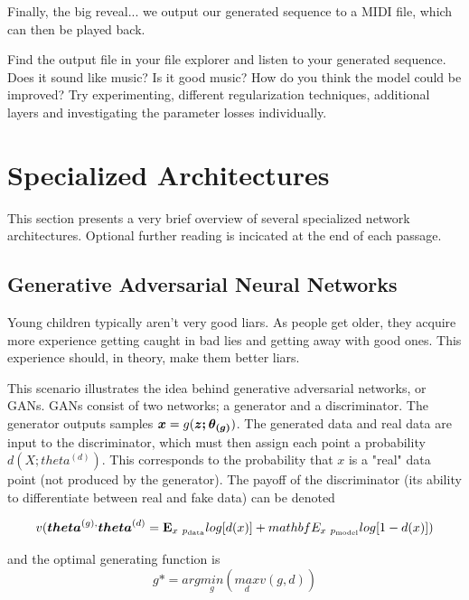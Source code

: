 \documentclass{article}
\begin{document}


Finally, the big reveal... we output our generated sequence to a MIDI file, which can then be played back.



Find the output file in your file explorer and listen to your generated sequence. Does it sound like music? Is it good music? How do you think the model could be improved? Try experimenting, different regularization techniques, additional layers and investigating the parameter losses individually.

\section{Specialized Architectures}

This section presents a very brief overview of several specialized network architectures. Optional further reading is incicated at the end of each passage.

\subsection{Generative Adversarial Neural Networks} %

Young children typically aren't very good liars. As people get older, they acquire more experience getting caught in bad lies and getting away with good ones. This experience should, in theory, make them better liars.

This scenario illustrates the idea behind generative adversarial networks, or GANs. GANs consist of two networks; a generator and a discriminator. The generator outputs samples \(\vb*{x} = g(\vb*{z; \theta_{(g)}})\). The generated data and real data are input to the discriminator, which must then assign each point a probability \(d(X; theta^{(d)})\). This corresponds to the probability that \(x\) is a "real" data point (not produced by the generator). The payoff of the discriminator \cite{Goodfellow-et-al-2016} (its ability to differentiate between real and fake data) can be denoted 

\[v(\vb*{theta}^{(g),}\vb*{theta}^{(d)} = \mathbf{E}_{x~p_{\text{data}}}log[d(x)] + mathbf{E}_{x~p_{\text{model}}}log[1-d(x)])\]

and the optimal generating function \cite{Goodfellow-et-al-2016} is
\[g* = arg\underset{g}{min}(\underset{d}{max}v(g,d))\]
\end{document}
